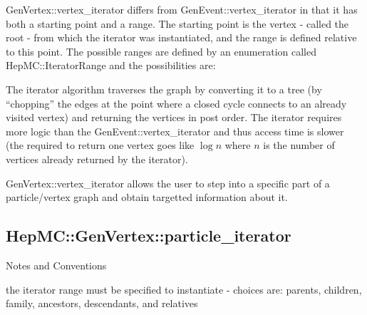 \documentclass[11pt,letterpaper]{article}
\begin{document}
GenVertex::vertex\_iterator differs from GenEvent::vertex\_iterator
in that it has both a starting point and a range. The starting point
is the vertex - called the root - from which the iterator was
instantiated, and the range is defined relative to this point.
The possible ranges are defined by an enumeration called
HepMC::IteratorRange and the possibilities are:
\begin{itemize}\setlength{\itemsep}{0pt}
\end{itemize}

The iterator algorithm traverses the graph by converting it to a tree
(by ``chopping'' the edges at the point where a closed cycle connects
to an already visited vertex) and returning the vertices in post
order. The iterator requires more logic than the
GenEvent::vertex\_iterator and thus access time is slower (the
required to return one vertex goes like $\log n$ where $n$ is the
number of vertices already returned by the iterator).

GenVertex::vertex\_iterator allows the user to step into a specific part
of a particle/vertex graph and obtain targetted information about it. 

%
%

\subsection{HepMC::GenVertex::particle\_iterator}
\begin{myitemize}{Notes and Conventions}
  \item the iterator range must be specified to instantiate -
    choices are: parents, children, family, ancestors, descendants,
    and relatives 
\end{myitemize}
\end{document}
